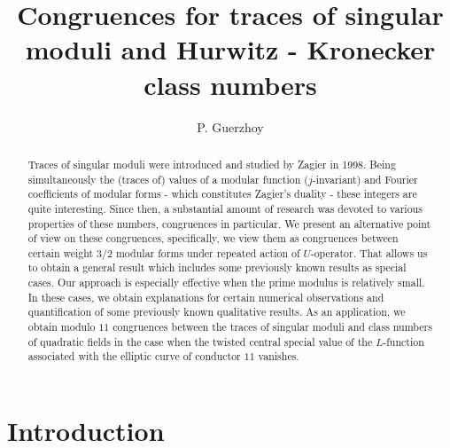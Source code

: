\documentclass[11pt,letterpaper]{amsart}
\newcommand{\gp}{{\mathfrak p}}
\theoremstyle{remark}
\begin{document}
  


\author[P. Guerzhoy]{P. Guerzhoy}
\address{ 
Department of Mathematics,
University of Hawaii, 
2565 McCarthy Mall, 
Honolulu, HI,  96822-2273 
}


\title[]{Congruences for traces of singular moduli and Hurwitz - Kronecker class numbers}
\begin{abstract}

Traces of singular moduli were introduced and studied by Zagier in 1998. Being simultaneously the (traces of) values of a modular function ($j$-invariant) and Fourier coefficients of modular forms 
- which constitutes Zagier's duality - these integers are quite interesting. 
Since then, a substantial amount of research was devoted to various properties of these numbers, congruences in particular. 
We present an alternative point of view on these congruences, specifically, we view them as congruences between certain weight $3/2$ modular forms under repeated action of $U$-operator. 
That allows us to obtain a general result which includes some previously known results as special cases. Our approach is especially effective when the prime modulus is relatively small.
In these cases, we obtain explanations for certain numerical observations and quantification of some previously known qualitative results. 
As an application, we obtain  modulo $11$ congruences between the traces of singular moduli and class numbers of quadratic fields in the case when the twisted central special value of the $L$-function associated with the elliptic curve of conductor $11$ vanishes. 

\end{abstract}

\maketitle


\section{Introduction} \label{sec_intro}
\end{document}
